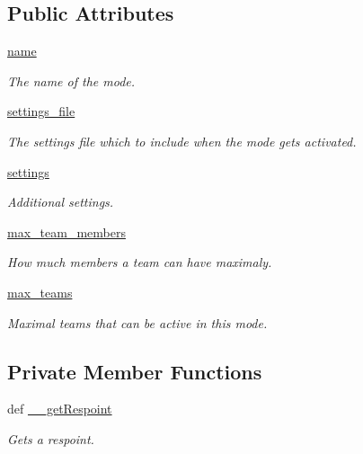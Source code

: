 \subsection*{Public Attributes}
\begin{DoxyCompactItemize}
\item 
\hyperlink{class_mode_1_1_mode_a38afa93ee0f4ad9e8258a510ccdbaa9c}{name}
\begin{DoxyCompactList}\small\item\em The name of the mode. \item\end{DoxyCompactList}\item 
\hyperlink{class_mode_1_1_mode_a40402dcfd634686dcd9b2ce8b8f3d4eb}{settings\_\-file}
\begin{DoxyCompactList}\small\item\em The settings file which to include when the mode gets activated. \item\end{DoxyCompactList}\item 
\hyperlink{class_mode_1_1_mode_af4bebfeddda24f7437fc086bc52ca711}{settings}
\begin{DoxyCompactList}\small\item\em Additional settings. \item\end{DoxyCompactList}\item 
\hyperlink{class_mode_1_1_mode_ad4ba6cae17b92d4c8c85c35dc9418c8b}{max\_\-team\_\-members}
\begin{DoxyCompactList}\small\item\em How much members a team can have maximaly. \item\end{DoxyCompactList}\item 
\hyperlink{class_mode_1_1_mode_a55c4e205a8cb20550c0f3924471522ab}{max\_\-teams}
\begin{DoxyCompactList}\small\item\em Maximal teams that can be active in this mode. \item\end{DoxyCompactList}\end{DoxyCompactItemize}
\subsection*{Private Member Functions}
\begin{DoxyCompactItemize}
\item 
def \hyperlink{class_mode_1_1_mode_af6ee8ed30365011c35b48d4c5696e05b}{\_\-\_\-getRespoint}
\begin{DoxyCompactList}\small\item\em Gets a respoint. \item\end{DoxyCompactList}\end{DoxyCompactItemize}
